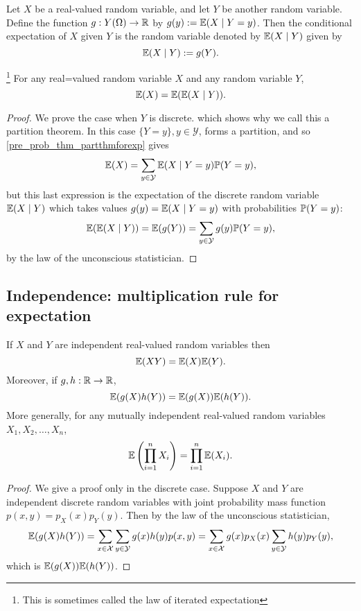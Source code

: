\documentclass[10pt, a4paper]{article}
\begin{document}
\begin{definition}
    Let $X$ be a real-valued random variable,
    and let $Y$ be another random variable.
    Define the function $g : Y(\Omega) \rightarrow \R$ by $g(y) := \E(X\mid Y = y)$.
    Then the conditional expectation of $X$ given $Y$ is the random variable denoted by $\E(X\mid Y)$ given by
    \[
    \E(X \mid Y) := g(Y).
    \]
\end{definition}

\begin{theorem}
\footnote{This is sometimes called the law of iterated expectation}
    For any real=valued random variable $X$ and any random variable $Y$,
    \[
    \E(X) = \E(\E(X \mid Y)).
    \]
    \begin{proof}
        We prove the case when $Y$ is discrete.
        which shows why we call this a partition theorem.
        In this case $\{Y = y\}, y \in \mathcal{Y}$,
        forms a partition,
        and so \autoref{pre_prob_thm_partthmforexp} gives
        \[
        \E(X) = \sum_{y \in \mathcal{Y}}\E(X\mid Y = y)\P(Y = y),
        \]
        but this last expression is the expectation of the discrete random variable $\E(X\mid Y)$ which takes values $g(y) = \E(X\mid Y = y)$ with probabilities $\P(Y = y)$:
        \[
        \E(\E(X \mid Y)) = \E(g(Y)) = \sum_{y \in \mathcal{Y}}g(y)\P(Y = y),
        \]
        by the law of the unconscious statistician.
    \end{proof}
\end{theorem}

\subsection{Independence: multiplication rule for expectation}
\begin{theorem}
    If $X$ and $Y$ are independent real-valued random variables then
    \[
    \E(XY) = \E(X)\E(Y).
    \]
    Moreover, if $g, h : \R \rightarrow \R$,
    \[
    \E(g(X)h(Y)) = \E(g(X))\E(h(Y)).
    \]
    More generally,
    for any mutually independent real-valued random variables $X_1, X_2, \dotsc, X_n$,
    \[
    \E\left(\prod_{i = 1}^{n}X_i\right) = \prod_{i = 1}^{n}\E(X_i).
    \]
    \begin{proof}
        We give a proof only in the discrete case.
        Suppose $X$ and $Y$ are independent discrete random variables with joint probability mass function $p(x, y) = p_X(x)p_Y(y)$.
        Then by the law of the unconscious statistician,
        \[
        \E(g(X)h(Y)) = \sum_{x \in \mathcal{X}}\sum_{y \in \mathcal{Y}}g(x)h(y)p(x, y) = \sum_{x \in \mathcal{X}}g(x)p_X(x)\sum_{y \in \mathcal{Y}}h(y)p_Y(y),
        \]
        which is $\E(g(X))\E(h(Y))$.
    \end{proof}
\end{theorem}
\end{document}
